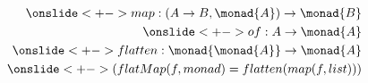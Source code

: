 \begin{align*}
  \onslide<+->{map: (A \to B, \monad{A}) \to \monad{B}} \\
  \onslide<+->{of: A \to \monad{A}} \\
  \onslide<+->{flatten: \monad{\monad{A}} \to \monad{A}} \\
  \onslide<+->{(flatMap(f, monad) = flatten(map(f, list)))}
\end{align*}
